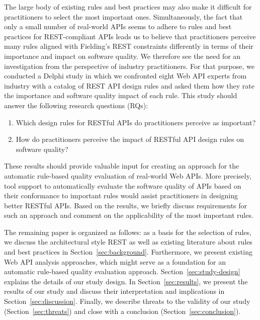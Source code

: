 \documentclass[runningheads]{llncs}
\begin{document}
The large body of existing rules and best practices may also make it difficult for practitioners to select the most important ones.
Simultaneously, the fact that only a small number of real-world APIs seems to adhere to rules and best practices for REST-compliant APIs leads us to believe that practitioners perceive many rules aligned with Fielding's REST constraints differently in terms of their importance and impact on software quality.
We therefore see the need for an investigation from the perspective of industry practitioners.
For that purpose, we conducted a Delphi study in which we confronted eight Web API experts from industry with a catalog of REST API design rules and asked them how they rate the importance and software quality impact of each rule. This study should answer the following research questions (RQs):

\begin{enumerate}[label=\textbf{RQ\arabic*:}, leftmargin=*]
    \item Which design rules for RESTful APIs do practitioners perceive as important?
    \item How do practitioners perceive the impact of RESTful API design rules on software quality?
\end{enumerate}

These results should provide valuable input for creating an approach for the automatic rule-based quality evaluation of real-world Web APIs.
More precisely, tool support to automatically evaluate the software quality of APIs based on their conformance to important rules would assist practitioners in designing better RESTful APIs.
Based on the results, we briefly discuss requirements for such an approach and comment on the applicability of the most important rules.

The remaining paper is organized as follows:
as a basis for the selection of rules, we discuss the architectural style REST as well as existing literature about rules and best practices in Section~\ref{sec:background}.
Furthermore, we present existing Web API analysis approaches, which might serve as a foundation for an automatic rule-based quality evaluation approach.
Section~\ref{sec:study-design} explains the details of our study design.
In Section~\ref{sec:results}, we present the results of our study and discuss their interpretation and implications in Section~\ref{sec:discussion}.
Finally, we describe threats to the validity of our study (Section~\ref{sec:threats}) and close with a conclusion (Section~\ref{sec:conclusion}).
\end{document}
